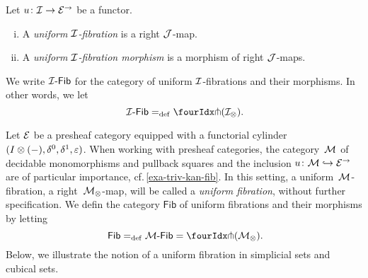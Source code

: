 \documentclass[reqno,10pt,a4paper,oneside,draft]{amsart}
\begin{document}
\begin{definition} \label{def:I-fibration}
Let $u \co \cal{I} \to \catE^\to$ be a functor.
\begin{enumerate}[(i)]
\item A \emph{uniform $\cal{I}$-fibration} is a right $\cal{J}$-map.
\item A \emph{uniform $\cal{I}$-fibration morphism} is a morphism of right $\cal{J}$-maps.
\end{enumerate}
\end{definition}

\medskip

We write $\Fib{\cal{I}}$ for the category of uniform $\cal{I}$-fibrations and their morphisms.
In other words, we let
\[
\Fib{\cal{I}} \defeq \liftr{(\cal{I}_\otimes)} \rlap{.}
\]

\medskip


\begin{example}
Let $\catE$ be a presheaf category equipped with a functorial cylinder $(\interval \otimes (-), \lcyl, \rcyl, \ccyl)$.
When working with presheaf categories, the category~$\cal{M}$ of decidable monomorphisms and pullback squares and the inclusion $u \co \cal{M} \hookrightarrow \cal{E}^\to$ are of particular importance, {cf.}\,\cref{exa-triv-kan-fib}.
In this setting, a uniform~$\cal{M}$-fibration, \ie a right~$\cal{M}_\otimes$-map, will be called a \emph{uniform fibration}, without further specification.
We defin the category $\mathsf{Fib}$ of uniform fibrations and their morphisms by letting
\[
\mathsf{Fib} \defeq \Fib{\cal{M}} = \liftr{(\cal{M}_\otimes)} \rlap{.}
\]
Below, we illustrate the notion of a uniform fibration in simplicial sets and cubical sets.
\end{example}
\end{document}
